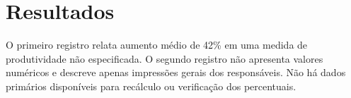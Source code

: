 \section{Resultados}
O primeiro registro relata aumento médio de 42\% em uma medida de produtividade não especificada.
O segundo registro não apresenta valores numéricos e descreve apenas impressões gerais dos responsáveis.
Não há dados primários disponíveis para recálculo ou verificação dos percentuais.
